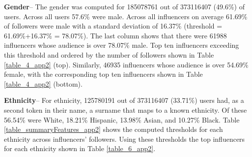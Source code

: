 \noindent\textbf{Gender}-- The gender was computed for 185078761 out of 373116407 (49.6\%) of users. Across all users 57.6\% were male. Across all influencers on average 61.69\% of followers were male with a standard deviation of 16.37\% (threshold = 61.69\%+16.37\% = 78.07\%). The last column shows that there were 61988 influencers whose audience is over 78.07\% male. Top ten influencers exceeding this threshold and ordered by the number of followers shown in Table \ref{table_4_app2} (top). Similarly, 46935 influencers whose audience is over 54.69\% female, with the corresponding top ten influencers shown in Table \ref{table_4_app2} (bottom). 

\noindent\textbf{Ethnicity}-- For ethnicity, 125780191 out of 373116407 (33.71\%) users had, as a second token in their name, a surname that maps to a known ethnicity. Of these 56.54\% were White, 18.21\% Hispanic, 13.98\% Asian, and 10.27\% Black. Table \ref{table_summaryFeatures_app2} shows the computed thresholds for each ethnicity across influencers' followers. Using these thresholds the top influencers for each ethnicity shown in Table \ref{table_6_app2}. %

